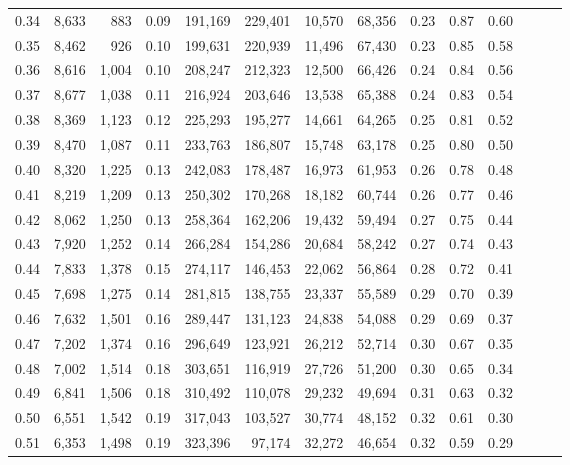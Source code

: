 \begin{tabular}{rrrrrrrrrrrrrr}
0.34 &   8,633 &    883 &  0.09 &  191,169 &  229,401 &  10,570 &  68,356 &  0.23 &  0.87 &      0.60 \\
0.35 &   8,462 &    926 &  0.10 &  199,631 &  220,939 &  11,496 &  67,430 &  0.23 &  0.85 &      0.58 \\
0.36 &   8,616 &  1,004 &  0.10 &  208,247 &  212,323 &  12,500 &  66,426 &  0.24 &  0.84 &      0.56 \\
0.37 &   8,677 &  1,038 &  0.11 &  216,924 &  203,646 &  13,538 &  65,388 &  0.24 &  0.83 &      0.54 \\
0.38 &   8,369 &  1,123 &  0.12 &  225,293 &  195,277 &  14,661 &  64,265 &  0.25 &  0.81 &      0.52 \\
0.39 &   8,470 &  1,087 &  0.11 &  233,763 &  186,807 &  15,748 &  63,178 &  0.25 &  0.80 &      0.50 \\
0.40 &   8,320 &  1,225 &  0.13 &  242,083 &  178,487 &  16,973 &  61,953 &  0.26 &  0.78 &      0.48 \\
0.41 &   8,219 &  1,209 &  0.13 &  250,302 &  170,268 &  18,182 &  60,744 &  0.26 &  0.77 &      0.46 \\
0.42 &   8,062 &  1,250 &  0.13 &  258,364 &  162,206 &  19,432 &  59,494 &  0.27 &  0.75 &      0.44 \\
0.43 &   7,920 &  1,252 &  0.14 &  266,284 &  154,286 &  20,684 &  58,242 &  0.27 &  0.74 &      0.43 \\
0.44 &   7,833 &  1,378 &  0.15 &  274,117 &  146,453 &  22,062 &  56,864 &  0.28 &  0.72 &      0.41 \\
0.45 &   7,698 &  1,275 &  0.14 &  281,815 &  138,755 &  23,337 &  55,589 &  0.29 &  0.70 &      0.39 \\
0.46 &   7,632 &  1,501 &  0.16 &  289,447 &  131,123 &  24,838 &  54,088 &  0.29 &  0.69 &      0.37 \\
0.47 &   7,202 &  1,374 &  0.16 &  296,649 &  123,921 &  26,212 &  52,714 &  0.30 &  0.67 &      0.35 \\
0.48 &   7,002 &  1,514 &  0.18 &  303,651 &  116,919 &  27,726 &  51,200 &  0.30 &  0.65 &      0.34 \\
0.49 &   6,841 &  1,506 &  0.18 &  310,492 &  110,078 &  29,232 &  49,694 &  0.31 &  0.63 &      0.32 \\
0.50 &   6,551 &  1,542 &  0.19 &  317,043 &  103,527 &  30,774 &  48,152 &  0.32 &  0.61 &      0.30 \\
0.51 &   6,353 &  1,498 &  0.19 &  323,396 &   97,174 &  32,272 &  46,654 &  0.32 &  0.59 &      0.29 \\

\end{tabular}
